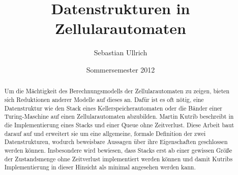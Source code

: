 \documentclass{article}
\title{Datenstrukturen in Zellularautomaten}
\author{Sebastian Ullrich}
\date{Sommersemester 2012}
\begin{document}
\newcommand{\ca}{\ensuremath\mathcal{A}}
\newcommand{\abs}[1]{\lvert#1\rvert}
\newcommand{\ceil}[1]{\lceil#1\rceil}
\newcommand{\zrange}[1]{\{1,\dots,#1\}}
\newcommand{\bild}[1]{\text{Bild}(#1)}
\newcommand{\N}{\mathbb{N}}
\newcommand{\ve}[3]{\begin{pmatrix}#1\\#2\\#3\end{pmatrix}}
\newcommand{\vet}[2]{\begin{pmatrix}#1\\#2\end{pmatrix}}

\newcommand{\pop}{\ensuremath{\mathit{pop}}\xspace}
\newcommand{\popZiel}{\ensuremath{\mathit{popZiel}}\xspace}
\newcommand{\popQuelle}{\ensuremath{\mathit{popQuelle}}\xspace}
\newcommand{\nop}{\ensuremath{\mathit{nop}}\xspace}
\newcommand{\push}{\ensuremath{\mathit{push}}\xspace}
\newcommand{\pushZiel}{\ensuremath{\mathit{pushZiel}}\xspace}
\newcommand{\pushQuelle}{\ensuremath{\mathit{pushQuelle}}\xspace}
\newcommand{\enqueue}{\ensuremath{\mathit{enqueue}}\xspace}
\newcommand{\dequeue}{\ensuremath{\mathit{dequeue}}\xspace}
\newcommand{\shiftUp}{\ensuremath{\mathit{shiftUp}}\xspace}
\newcommand{\demogrid}[1]{
    \begin{scope}
        \clip (-0.1,-0.1) rectangle (3.5,#1+0.1);
        \draw (1) (0,0) grid (4,#1);
    \end{scope}
}

\maketitle
\newpage

\begin{abstract}
    Um die Mächtigkeit des Berechnungsmodells der Zellularautomaten zu zeigen, bieten sich Reduktionen anderer Modelle auf dieses an. Dafür ist es oft nötig, eine Datenstruktur wie den Stack eines Kellerspeicherautomaten oder die Bänder einer Turing-Maschine auf einen Zellularautomaten abzubilden. Martin Kutrib beschreibt in \cite{kutrib08} die Implementierung eines Stacks und einer Queue ohne Zeitverlust. Diese Arbeit baut darauf auf und erweitert sie um eine allgemeine, formale Definition der zwei Datenstrukturen, wodurch beweisbare Aussagen über ihre Eigenschaften geschlossen werden können. Insbesondere wird bewiesen, dass Stacks erst ab einer gewissen Größe der Zustandsmenge ohne Zeitverlust implementiert werden können und damit Kutribs Implementierung in dieser Hinsicht als minimal angesehen werden kann.
\end{abstract}
\end{document}
